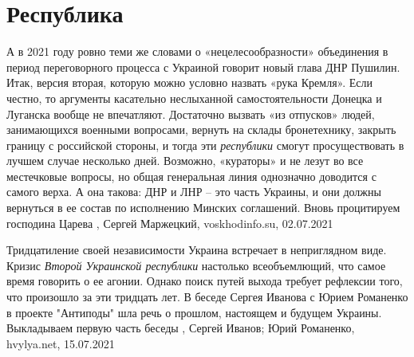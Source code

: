  
 
 
 
 
\chapter{Республика}

А в 2021 году ровно теми же словами о «нецелесообразности» объединения в период
переговорного процесса с Украиной говорит новый глава ДНР Пушилин. Итак, версия
вторая, которую можно условно назвать «рука Кремля». Если честно, то аргументы
касательно неслыханной самостоятельности Донецка и Луганска вообще не
впечатляют. Достаточно вызвать «из отпусков» людей, занимающихся военными
вопросами, вернуть на склады бронетехнику, закрыть границу с российской
стороны, и тогда эти \emph{республики} смогут просуществовать в лучшем случае
несколько дней. Возможно, «кураторы» и не лезут во все местечковые вопросы, но
общая генеральная линия однозначно доводится с самого верха. А она такова: ДНР
и ЛНР – это часть Украины, и они должны вернуться в ее состав по исполнению
Минских соглашений. Вновь процитируем господина Царева
, 
Сергей Маржецкий, voskhodinfo.su, 02.07.2021

Тридцатиление своей независимости Украина встречает в неприглядном виде. Кризис
\emph{Второй Украинской республики} настолько всеобъемлющий, что самое время говорить
о ее агонии. Однако поиск путей выхода требует рефлексии того, что произошло за
эти тридцать лет.  В беседе Сергея Иванова с Юрием Романенко в проекте
"Антиподы" шла речь о прошлом, настоящем и будущем Украины. Выкладываем первую
часть беседы
, 
Сергей Иванов; Юрий Романенко, hvylya.net, 15.07.2021

